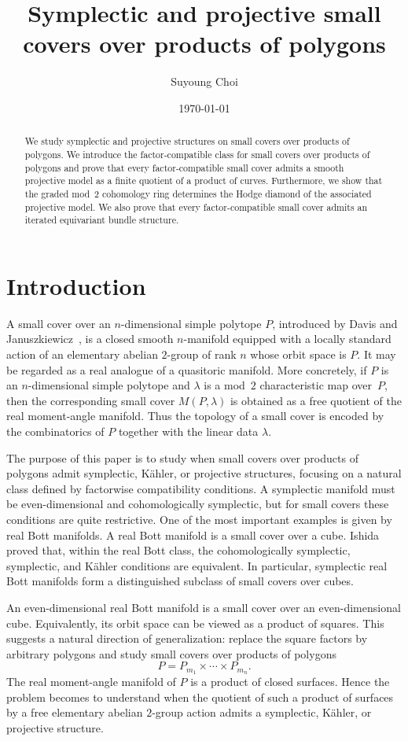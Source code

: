 \documentclass{amsart}
\title{Symplectic and projective small covers over products of polygons}
\author[S. Choi]{Suyoung Choi}
\date{\today}
\numberwithin{equation}{section}
\theoremstyle{definition}
\theoremstyle{remark}
\begin{document}
\begin{abstract}
We study symplectic and projective structures on small covers over products of polygons.
We introduce the factor-compatible class for small covers over products of polygons and prove that every factor-compatible small cover admits a smooth projective model as a finite quotient of a product of curves.
Furthermore, we show that the graded mod~$2$ cohomology ring determines the Hodge diamond of the associated projective model.
We also prove that every factor-compatible small cover admits an iterated equivariant bundle structure.
\end{abstract}
\maketitle


\section{Introduction}
A small cover over an $n$-dimensional simple polytope $P$, introduced by Davis and Januszkiewicz~\cite{Davis-Januszkiewicz1991}, is a closed smooth $n$-manifold equipped with a locally standard action of an elementary abelian $2$-group of rank $n$ whose orbit space is $P$.
It may be regarded as a real analogue of a quasitoric manifold. 
More concretely, if $P$ is an $n$-dimensional simple polytope and $\lambda$ is a mod~$2$ characteristic map over~$P$, then the corresponding small cover $M(P,\lambda)$ is obtained as a free quotient of the real moment-angle manifold. 
Thus the topology of a small cover is encoded by the combinatorics of $P$ together with the linear data $\lambda$.

The purpose of this paper is to study when small covers over products of polygons admit symplectic, K\"ahler, or projective structures, focusing on a natural class defined by factorwise compatibility conditions.
A symplectic manifold must be even-dimensional and cohomologically symplectic, but for small covers these conditions are quite restrictive. 
One of the most important examples is given by real Bott manifolds. 
A real Bott manifold is a small cover over a cube. 
Ishida~\cite{Ishida2011} proved that, within the real Bott class, the cohomologically symplectic, symplectic, and K\"ahler conditions are equivalent. 
In particular, symplectic real Bott manifolds form a distinguished subclass of small covers over cubes.

An even-dimensional real Bott manifold is a small cover over an even-dimensional cube. 
Equivalently, its orbit space can be viewed as a product of squares. 
This suggests a natural direction of generalization: replace the square factors by arbitrary polygons and study small covers over products of polygons
$$
    P=P_{m_1}\times\cdots\times P_{m_n}.
$$
The real moment-angle manifold of $P$ is a product of closed surfaces. 
Hence the problem becomes to understand when the quotient of such a product of surfaces by a free elementary abelian $2$-group action admits a symplectic, K\"ahler, or projective structure.
\end{document}

